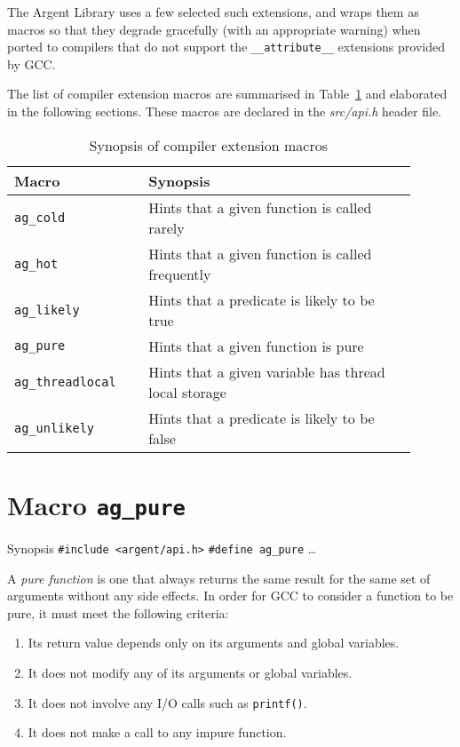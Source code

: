 The Argent Library uses a few selected such extensions, and wraps them as macros
so that they degrade gracefully (with an appropriate warning) when ported to 
compilers that do not support the \verb|__attribute__| extensions provided
by GCC.

The list of compiler extension macros are summarised in Table~\ref{tab:synopsis}
and elaborated in the following sections. These macros are declared in the
\emph{src/api.h} header file.

\renewcommand\arraystretch{1.1}
\begin{table}[!htbp]
  \centering
  \small
  \begin{tabular}[t]{>{\centering}m{0.3\linewidth}
    >{\raggedright\arraybackslash}m{0.6\linewidth}}
    \toprule
    \textbf{Macro} & \textbf{Synopsis} \\
    \midrule
    \verb|ag_cold| & Hints that a given function is called rarely \\
    \verb|ag_hot| & Hints that a given function is called frequently \\
    \verb|ag_likely| & Hints that a predicate is likely to be true \\
    \verb|ag_pure| & Hints that a given function is pure \\
    \verb|ag_threadlocal| & Hints that a given variable has thread local 
      storage \\
    \verb|ag_unlikely| & Hints that a predicate is likely to be false \\
    \bottomrule
  \end{tabular}
  \caption{Synopsis of compiler extension macros}
  \label{tab:synopsis}
\end{table}


%


\section{Macro \texttt{ag\_pure}}

  \begin{bclogo}[logo=\bccrayon, noborder=true, barre=snake, couleurBarre=gray]
    {Synopsis}
    \verb|#include <argent/api.h>|
    \verb|#define ag_pure| \ldots
  \end{bclogo}

  A \emph{pure function} is one that always returns the same result for the same
  set of arguments without any side effects. In order for GCC to consider a
  function to be pure, it must meet the following criteria:
  \begin{enumerate}
    \item Its return value depends only on its arguments and global variables.
    \item It does not modify any of its arguments or global variables.
    \item It does not involve any I/O calls such as \texttt{printf()}.
    \item It does not make a call to any impure function.
  \end{enumerate}

